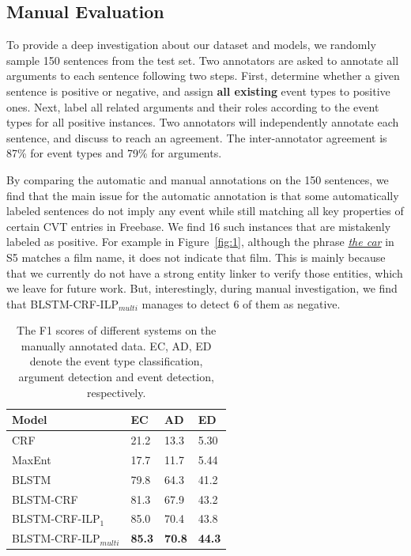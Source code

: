 \subsection{Manual Evaluation}\label{manualeve}
To provide a deep investigation about our dataset and models, we randomly sample 150 sentences 
from the test set. Two annotators are asked to annotate all arguments to each sentence following 
two steps. First, determine whether a given sentence is positive or negative, and assign \textbf{all existing} 
event types to positive ones. Next, label all related arguments and their roles according to 
the event types for all positive instances. Two annotators will independently annotate each sentence, 
and discuss to reach an agreement. The inter-annotator agreement is 87\% for event types and 79\% for arguments.


By comparing the automatic and manual annotations on the 150 sentences, we find that 
the main issue for the automatic annotation is that some automatically labeled sentences 
do not imply any event while still matching all key properties of certain CVT entries in Freebase. 
We find 16 such instances that are mistakenly labeled as positive. 
For example in Figure~\ref{fig:1}, although the phrase \underline{\emph{the car}} in S5 matches a film name, 
it does not indicate that film. %
This is mainly because that we currently do not have a strong entity linker to verify those entities, which we leave for
future work.
But, interestingly, 
during manual investigation, 
we find that BLSTM-CRF-ILP$_{multi}$ manages to detect 6 of them as negative.


\begin{table}[h]
\small
\centering
\begin{tabular}{|l|p{0.8cm}<{\centering}|p{0.8cm}<{\centering}|p{0.8cm}<{\centering}|} \hline
	Model & EC & AD & ED \\ \hline
	CRF & 21.2 & 13.3 & 5.30 \\ \hline
	MaxEnt & 17.7 & 11.7 & 5.44 \\ \hline
	BLSTM & 79.8 & 64.3 & 41.2 \\ \hline \hline
	BLSTM-CRF & 81.3 & 67.9 & 43.2 \\ \hline
	BLSTM-CRF-ILP$_{1}$ & 85.0 & 70.4 & 43.8 \\ \hline
	BLSTM-CRF-ILP$_{multi}$ & \textbf{85.3} & \textbf{70.8} & \textbf{44.3} \\ \hline
\end{tabular}
\caption{The F1 scores of different systems on the manually annotated data. EC, AD, ED denote the event type classification, argument detection and event detection, respectively. \label{tab:2}}
\end{table}

